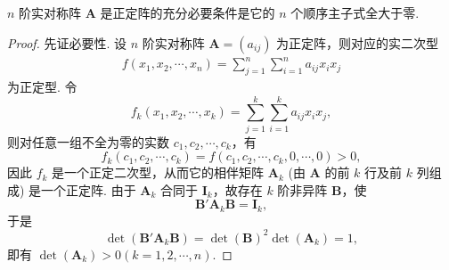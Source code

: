 \documentclass[../../main.tex]{subfiles}
\begin{document}
\begin{theorem}\label{theorem:实正定阵的充要条件}
$n$ 阶实对称阵 $\boldsymbol{A}$ 是正定阵的充分必要条件是它的 $n$ 个顺序主子式全大于零.
\end{theorem}
\begin{proof}
先证必要性. 设 $n$ 阶实对称阵 $\boldsymbol{A}=(a_{ij})$ 为正定阵，则对应的实二次型
\begin{align*}
f(x_1,x_2,\cdots,x_n)=\sum_{j = 1}^n\sum_{i = 1}^n a_{ij}x_ix_j
\end{align*}
为正定型. 令
\[
f_k(x_1,x_2,\cdots,x_k)=\sum_{j = 1}^k\sum_{i = 1}^k a_{ij}x_ix_j,
\]
则对任意一组不全为零的实数 $c_1,c_2,\cdots,c_k$，有
\[
f_k(c_1,c_2,\cdots,c_k)=f(c_1,c_2,\cdots,c_k,0,\cdots,0)>0,
\]
因此 $f_k$ 是一个正定二次型，从而它的相伴矩阵 $\boldsymbol{A}_k$ (由 $\boldsymbol{A}$ 的前 $k$ 行及前 $k$ 列组成) 是一个正定阵. 由于 $\boldsymbol{A}_k$ 合同于 $\boldsymbol{I}_k$，故存在 $k$ 阶非异阵 $\boldsymbol{B}$，使
\[
\boldsymbol{B}'\boldsymbol{A}_k\boldsymbol{B}=\boldsymbol{I}_k,
\]
于是
\[
\det(\boldsymbol{B}'\boldsymbol{A}_k\boldsymbol{B})=\det(\boldsymbol{B})^2\det(\boldsymbol{A}_k)=1,
\]
即有 $\det(\boldsymbol{A}_k)>0 (k = 1,2,\cdots,n)$.


\end{proof}
\end{document}
